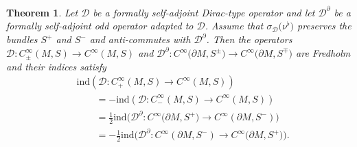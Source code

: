 \documentclass[pdftex]{sigma}
\numberwithin{equation}{section}
\newtheorem{Theorem}{Theorem}[section]
\begin{document}
\begin{Theorem}\label{thm:HolIndex}
Let $\mathcal{D}$ be a formally self-adjoint Dirac-type operator and let $\mathcal{D}^\partial$ be a formally self-adjoint odd operator adapted to $\mathcal{D}$.
Assume that $\sigma_{\mathcal{D}}\big(\nu^\flat\big)$ preserves the bundles $S^+$ and $S^-$ and anti-commutes with $\mathcal{D}^\partial$.
Then the operators $\mathcal{D}\colon C^\infty_\pm(M,S)\to C^\infty(M,S)$ and $\mathcal{D}^\partial\colon C^\infty\big(\partial M,S^\pm\big)\to C^\infty\big(\partial M,S^\mp\big)$ are Fredholm and their indices satisfy
\begin{align}
&\mathrm{ind}(\mathcal{D}\colon C^\infty_+(M,S) \to C^\infty(M,S)) \nonumber \\
&\qquad=
-\mathrm{ind}(\mathcal{D}\colon C^\infty_-(M,S)\to C^\infty(M,S)) \label{eq:ind1}\\
&\qquad=
\frac{1}{2} \mathrm{ind}\big(\mathcal{D}^\partial\colon C^\infty\big(\partial M,S^+\big)\to C^\infty(\partial M,S^-)\big) \label{eq:ind2}\\
&\qquad=
-\frac{1}{2} \mathrm{ind}\big(\mathcal{D}^\partial\colon C^\infty(\partial M,S^-)\to C^\infty\big(\partial M,S^+\big)\big) .\label{eq:ind3}
\end{align}
\end{Theorem}
\end{document}
